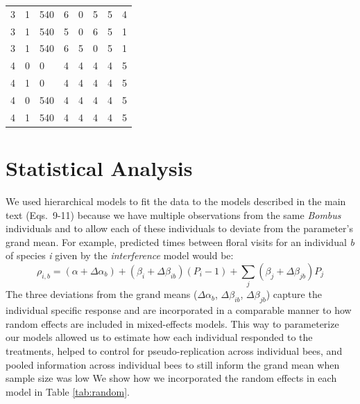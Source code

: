 \begin{refsection}
\begin{table}[H]
{\begin{tabular}{@{}llllllll@{}}
3        & 1                  & 540         & 6               & 0             & 5             & 5                  & 4                    \\
3        & 1                  & 540         & 5               & 0             & 6             & 5                  & 1                    \\
3        & 1                  & 540         & 6               & 5             & 0             & 5                  & 1                    \\
4        & 0                  & 0           & 4               & 4             & 4             & 4                  & 5                    \\
4        & 1                  & 0           & 4               & 4             & 4             & 4                  & 5                    \\
4        & 0                  & 540         & 4               & 4             & 4             & 4                  & 5                    \\
4        & 1                  & 540         & 4               & 4             & 4             & 4                  & 5                    \\ \bottomrule
\end{tabular}}
\end{table}

\section*{Statistical Analysis}

We used hierarchical models to fit the data to the models described in the main text (Eqs.~9-11) because we have multiple observations from the same \textit{Bombus} individuals and to allow each of these individuals to deviate from the parameter's grand mean. For example, predicted times between floral visits for an individual \textit{b} of species \textit{i} given by the \textit{interference} model would be:
\begin{equation}
    \rho_{i,b} = (\alpha + \Delta \alpha_{b}) +  (\beta_{i}+ \Delta\beta_{ib})  (P_{i}-1) +    \sum_{j} (\beta_{j}+ \Delta\beta_{jb})P_{j}
\end{equation}
The three deviations from the grand means ($\Delta\alpha_{b}$, $\Delta\beta_{ib}$, $\Delta\beta_{jb}$) capture the individual specific response and are incorporated in a comparable manner to how random effects are included in mixed-effects models. This way to parameterize our models allowed us to estimate how each individual responded to the treatments, helped to control for pseudo-replication across individual bees, and pooled information across individual bees to still inform the grand mean when sample size was low We show how we incorporated the random effects in each model in  Table \ref{tab:random}.



\end{refsection}
